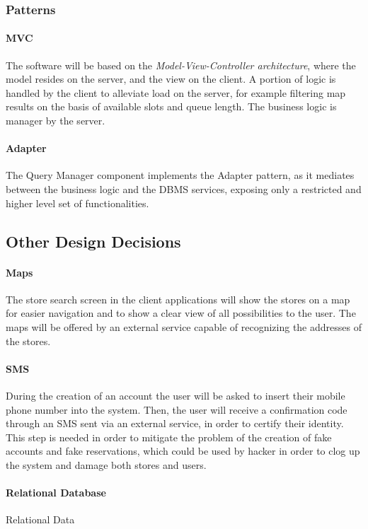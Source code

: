 \subsubsection{Patterns}

\paragraph{MVC} The software will be based on the \emph{Model-View-Controller architecture}, where the model resides on the server, and the view on the client. A portion of logic is handled by the client to alleviate load on the server, for example filtering map results on the basis of available slots and queue length. The business logic is manager by the server.

\paragraph{Adapter}
The Query Manager component implements the Adapter pattern, as it mediates between the business logic and the DBMS services, exposing only a restricted and higher level set of functionalities.

\subsection{Other Design Decisions}

\paragraph{Maps}
The store search screen in the client applications will show the stores on a map for easier navigation and to show a clear view of all possibilities to the user. The maps will be offered by an external service capable of recognizing the addresses of the stores.

\paragraph{SMS}
During the creation of an account the user will be asked to insert their mobile phone number into the system. Then, the user will receive a confirmation code through an SMS sent via an external service, in order to certify their identity. This step is needed in order to mitigate the problem of the creation of fake accounts and fake reservations, which could be used by hacker in order to clog up the system and damage both stores and users.

\paragraph{Relational Database}
Relational Data
